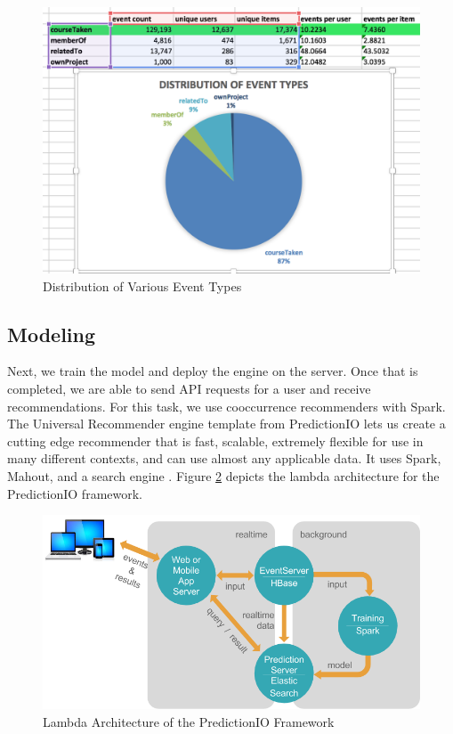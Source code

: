\documentclass[12pt,journal]{IEEEtran}
\begin{document}
\begin{figure}[htbp]
\begin{center}
\includegraphics[width=1\columnwidth]{DistEventTypes}
\end{center}
\caption{Distribution of Various Event Types}
\label{fig:DistEventTypes}
\end{figure}

\subsection{Modeling}

Next, we train the model and deploy the engine on the server.  Once that is completed, we are able to send API requests for a user and receive recommendations.  For this task, we use cooccurrence recommenders with Spark.  The Universal Recommender engine template from PredictionIO lets us create a cutting edge recommender that is fast, scalable, extremely flexible for use in many different contexts, and can use almost any applicable data.  It uses Spark, Mahout, and a search engine \cite{patferrel}.  Figure \ref{fig:lambda_architecture} depicts the lambda architecture for the PredictionIO framework.

\begin{figure}[htbp]
\begin{center}
\includegraphics[width=1\columnwidth]{pio-architecture}
\end{center}
\caption{Lambda Architecture of the PredictionIO Framework}
\label{fig:lambda_architecture}
\end{figure}
\end{document}
